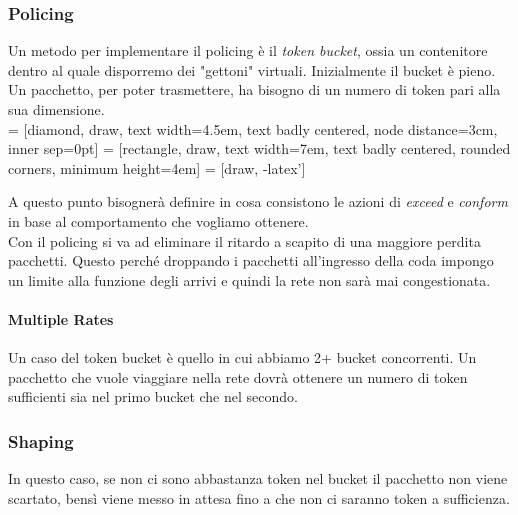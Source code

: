 \documentclass{article}
\begin{document}
\subsubsection{Policing}
Un metodo per implementare il policing è il \textit{token bucket}, ossia un contenitore dentro al quale disporremo dei "gettoni" virtuali. Inizialmente il bucket è pieno. Un pacchetto, per poter trasmettere, ha bisogno di un numero di token pari alla sua dimensione.\\

 = [diamond, draw, 
    text width=4.5em, text badly centered, node distance=3cm, inner sep=0pt]
 = [rectangle, draw, 
    text width=7em, text badly centered, rounded corners, minimum height=4em]
 = [draw, -latex']
    
A questo punto bisognerà definire in cosa consistono le azioni di \textit{exceed} e \textit{conform} in base al comportamento che vogliamo ottenere.\\
Con il policing si va ad eliminare il ritardo a scapito di una maggiore perdita pacchetti. Questo perché droppando i pacchetti all'ingresso della coda impongo un limite alla funzione degli arrivi e quindi la rete non sarà mai congestionata.
\paragraph{Multiple Rates} Un caso del token bucket è quello in cui abbiamo 2+ bucket concorrenti. Un pacchetto che vuole viaggiare nella rete dovrà ottenere un numero di token sufficienti sia nel primo bucket che nel secondo.

\subsubsection{Shaping}
In questo caso, se non ci sono abbastanza token nel bucket il pacchetto non viene scartato, bensì viene messo in attesa fino a che non ci saranno token a sufficienza.\\
\end{document}
